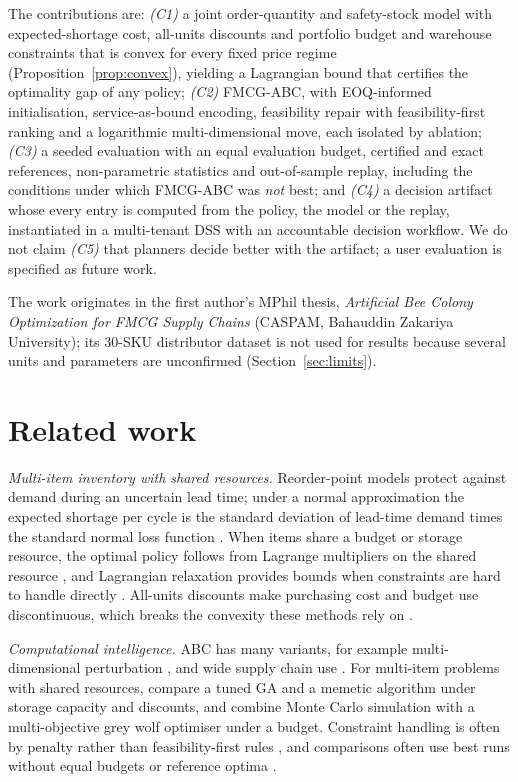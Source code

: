 \documentclass[preprint,12pt,authoryear]{elsarticle}
\begin{document}
{\sloppy The contributions are: \emph{(C1)} a joint order-quantity and safety-stock model with expected-shortage cost, all-units discounts and portfolio budget and warehouse constraints that is convex for every fixed price regime (Proposition~\ref{prop:convex}), yielding a Lagrangian bound that certifies the optimality gap of any policy; \emph{(C2)} FMCG-ABC, with EOQ-informed initialisation, service-as-bound encoding, feasibility repair with feasibility-first ranking and a logarithmic multi-dimensional move, each isolated by ablation; \emph{(C3)} a seeded evaluation with an equal evaluation budget, certified and exact references, non-parametric statistics and out-of-sample replay, including the conditions under which FMCG-ABC was \emph{not} best; and \emph{(C4)} a decision artifact whose every entry is computed from the policy, the model or the replay, instantiated in a multi-tenant DSS with an accountable decision workflow. We do not claim \emph{(C5)} that planners decide better with the artifact; a user evaluation is specified as future work.\par}

The work originates in the first author's MPhil thesis, \emph{Artificial Bee Colony Optimization for FMCG Supply Chains} (CASPAM, Bahauddin Zakariya University); its 30-SKU distributor dataset is not used for results because several units and parameters are unconfirmed (Section~\ref{sec:limits}).

\section{Related work}\label{sec:related}

\emph{Multi-item inventory with shared resources.} Reorder-point models protect against demand during an uncertain lead time; under a normal approximation the expected shortage per cycle is the standard deviation of lead-time demand times the standard normal loss function \citep{Silver1998,Axsater2015,Nahmias2009}. When items share a budget or storage resource, the optimal policy follows from Lagrange multipliers on the shared resource \citep{HadleyWhitin1963,RosenblattRothblum1990}, and Lagrangian relaxation provides bounds when constraints are hard to handle directly \citep{Everett1963,Fisher1981}. All-units discounts make purchasing cost and budget use discontinuous, which breaks the convexity these methods rely on \citep{Zipkin2000}.

\emph{Computational intelligence.} ABC \citep{Karaboga2007,Karaboga2008} has many variants, for example multi-dimensional perturbation \citep{Akay2012}, and wide supply chain use \citep{Kaya2022,Guo2025}. For multi-item problems with shared resources, \citet{Pasandideh2013} compare a tuned GA and a memetic algorithm under storage capacity and discounts, and \citet{Tan2024} combine Monte Carlo simulation with a multi-objective grey wolf optimiser under a budget. Constraint handling is often by penalty rather than feasibility-first rules \citep{Deb2000}, and comparisons often use best runs without equal budgets or reference optima \citep{Derrac2011}.
\end{document}
